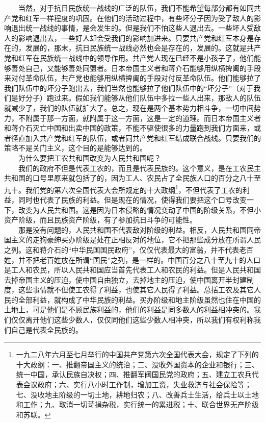 \documentclass[cn,11pt,chinese]{elegantbook}
\begin{document}
　　当然，对于抗日民族统一战线的广泛的队伍，我们不能希望每部分都有如同共产党和红军一样程度的巩固。在他们的活动过程中，有些坏分子因为受了敌人的影响退出统一战线的事情，是会发生的。但是我们不怕这些人退出去。一些坏人受敌人的影响退出去，一些好人却会受我们的影响加进来。只要共产党和红军本身是存在的，发展的，那末，抗日民族统一战线必然也会是存在的，发展的。这就是共产党和红军在民族统一战线中的领导作用。共产党人现在已经不是小孩子了，他们能够善处自己，又能够善处同盟者。日本帝国主义者和蒋介石能够用纵横捭阖的手段来对付革命队伍，共产党也能够用纵横捭阖的手段对付反革命队伍。他们能够拉了我们队伍中的坏分子跑出去，我们当然也能够拉了他们队伍中的“坏分子”（对于我们是好分子）跑过来。假如我们能够从他们队伍中多拉一些人出来，那敌人的队伍就减少了，我们的队伍就扩大了。总之，现在是两个基本势力相斗争，一切中间势力，不附属于那一方面，就附属于这一方面，这是一定的道理。而日本帝国主义者和蒋介石灭亡中国和出卖中国的政策，不能不驱使很多的力量跑到我们方面来，或者径直加入共产党和红军的队伍，或者同共产党和红军结成联合战线。只要我们的策略不是关门主义，这个目的是能够达到的。\\
　　为什么要把工农共和国改变为人民共和国呢？\\
　　我们的政府不但是代表工农的，而且是代表民族的。这个意义，是在工农民主共和国的口号里原来就包括了的，因为工人、农民占了全民族人口的百分之八十至九十。我们党的第六次全国代表大会所规定的十大政纲\footnote[32]{ 一九二八年六月至七月举行的中国共产党第六次全国代表大会，规定了下列的十大政纲：一、推翻帝国主义的统治；二、没收外国资本的企业和银行；三、统一中国，承认民族自决权；四、推翻军阀国民党的政府；五、建立工农兵代表会议政府；六、实行八小时工作制，增加工资，失业救济与社会保险等；七、没收地主阶级的一切土地，耕地归农；八、改善兵士生活，给兵士以土地和工作；九、取消一切苛捐杂税，实行统一的累进税；十、联合世界无产阶级和苏联。}，不但代表了工农的利益，同时也代表了民族的利益。但是现在的情况，使得我们要把这个口号改变一下，改变为人民共和国。这是因为日本侵略的情况变动了中国的阶级关系，不但小资产阶级，而且民族资产阶级，有了参加抗日斗争的可能性。\\
　　那是没有问题的，人民共和国不代表敌对阶级的利益。相反，人民共和国同帝国主义的走狗豪绅买办阶级是处在正相反对的地位，它不把那些成分放在所谓人民之列。这和蒋介石的“中华民国国民政府”，仅仅代表最大的富翁，并不代表老百姓，并不把老百姓放在所谓“国民”之列，是一样的。中国百分之八十至九十的人口是工人和农民，所以人民共和国应当首先代表工人和农民的利益。但是人民共和国去掉帝国主义的压迫，使中国自由独立，去掉地主的压迫，使中国离开半封建制度，这些事情就不但使工农得了利益，也使其它人民得了利益。总括工农及其它人民的全部利益，就构成了中华民族的利益。买办阶级和地主阶级虽然也住在中国的土地上，可是他们是不顾民族利益的，他们的利益是同多数人的利益相冲突的。我们仅仅离开他们这些少数人，仅仅同他们这些少数人相冲突，所以我们有权利称我们自己是代表全民族的。\\
\end{document}

